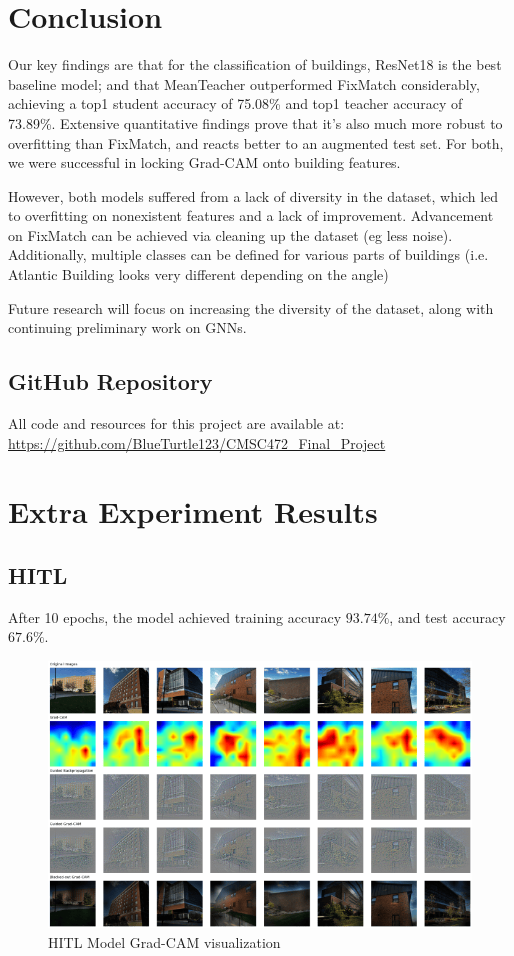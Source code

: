 \documentclass{article}
\begin{document}
\section{Conclusion}

Our key findings are that for the classification of buildings, ResNet18 is the best baseline model; and that MeanTeacher outperformed FixMatch considerably, achieving a top1 student accuracy of 75.08\% and top1 teacher accuracy of 73.89\%. Extensive quantitative findings prove that it's also much more robust to overfitting than FixMatch, and reacts better to an augmented test set. For both, we were successful in locking Grad-CAM onto building features. 

However, both models suffered from a lack of diversity in the dataset, which led to overfitting on nonexistent features and a lack of improvement. Advancement on FixMatch can be achieved via cleaning up the dataset (eg less noise). Additionally, multiple classes can be defined for various parts of buildings (i.e. Atlantic Building looks very different depending on the angle)

Future research will focus on increasing the diversity of the dataset, along with continuing preliminary work on GNNs. 

\subsection*{GitHub Repository}

All code and resources for this project are available at: \url{https://github.com/BlueTurtle123/CMSC472_Final_Project}

\newpage 
\appendix

\section{Extra Experiment Results}
\label{experiment_results}

\subsection{HITL}

After 10 epochs, the model achieved training accuracy $93.74\%$, and test accuracy $67.6\%$. 

\begin{figure}[H]
    \centering
    \includegraphics[width=0.8\linewidth]{hitl.png}
    \caption{HITL Model Grad-CAM visualization}
    \label{fig:hitl_results}
\end{figure}
\end{document}
